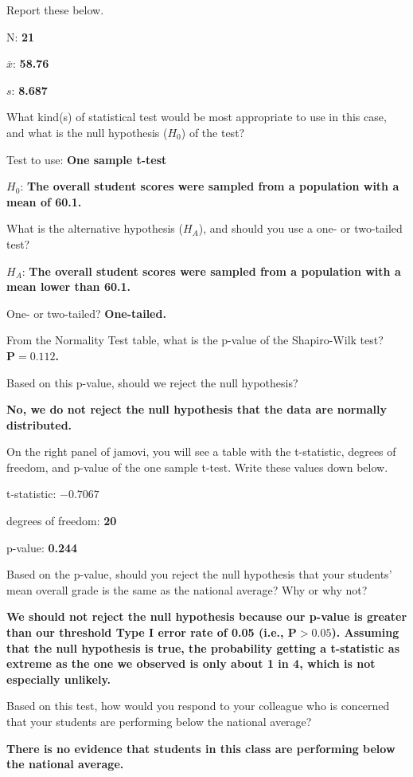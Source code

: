 \documentclass[
  openany]{krantz}
\begin{document}
Report these below.

N: \textbf{21}

\(\bar{x}\): \textbf{58.76}

\(s\): \textbf{8.687}

What kind(s) of statistical test would be most appropriate to use in this case, and what is the null hypothesis (\(H_{0}\)) of the test?

Test to use: \textbf{One sample t-test}

\(H_{0}\): \textbf{The overall student scores were sampled from a population with a mean of 60.1.}

What is the alternative hypothesis (\(H_{A}\)), and should you use a one- or two-tailed test?

\(H_{A}\): \textbf{The overall student scores were sampled from a population with a mean lower than 60.1.}

One- or two-tailed? \textbf{One-tailed.}

From the Normality Test table, what is the p-value of the Shapiro-Wilk test? \textbf{\(\mathbf{P = 0.112}\).}

Based on this p-value, should we reject the null hypothesis?

\textbf{No, we do not reject the null hypothesis that the data are normally distributed.}

On the right panel of jamovi, you will see a table with the t-statistic, degrees of freedom, and p-value of the one sample t-test. Write these values down below.

t-statistic: \textbf{\(\mathbf{-0.7067}\)}

degrees of freedom: \textbf{20}

p-value: \textbf{0.244}

Based on the p-value, should you reject the null hypothesis that your students' mean overall grade is the same as the national average? Why or why not?

\textbf{We should not reject the null hypothesis because our p-value is greater than our threshold Type I error rate of 0.05 (i.e., \(\mathbf{P > 0.05}\)). Assuming that the null hypothesis is true, the probability getting a t-statistic as extreme as the one we observed is only about 1 in 4, which is not especially unlikely.}

Based on this test, how would you respond to your colleague who is concerned that your students are performing below the national average?

\textbf{There is no evidence that students in this class are performing below the national average.}
\end{document}
